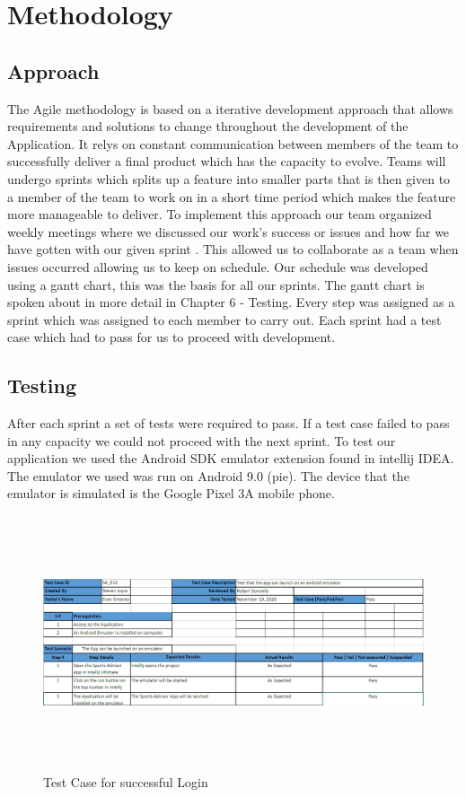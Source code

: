 \chapter{Methodology}
\section{Approach}
The Agile methodology is based on a iterative development approach that allows requirements and solutions to change throughout the development of the Application. It relys on constant communication between members of the team to successfully deliver a final product which has the capacity to evolve. Teams will undergo sprints which splits up a feature into smaller parts that is then given to a member of the team to work on in a short time period which makes the feature more manageable to deliver.
\newline
\newline
To implement this approach our team organized weekly meetings where we discussed our work's success or issues and how far we have gotten with our given sprint . This allowed us to collaborate as a team when issues occurred allowing us to keep on schedule. Our schedule was developed using a gantt chart, this was the basis for all our sprints. The gantt chart is spoken about in more detail in Chapter 6 - Testing. Every step was assigned as a sprint which was assigned to each member to carry out. Each sprint had a test case which had to pass for us to proceed with development.
\section{Testing}
After each sprint a set of tests were required to pass. If a test case failed to pass in any capacity we could not proceed with the next sprint. To test our application we used the Android SDK emulator extension found in intellij IDEA.
The emulator we used was run on Android 9.0 (pie). The device that the emulator is simulated is the Google Pixel 3A mobile phone.
\begin{figure}[H]
    \centering
    \includegraphics[width=15cm, height = 7.5cm]{img/EmulatorLaunch.PNG}
    \caption{Test Case for successful Login}
    \label{fig:altas config}
\end{figure}

